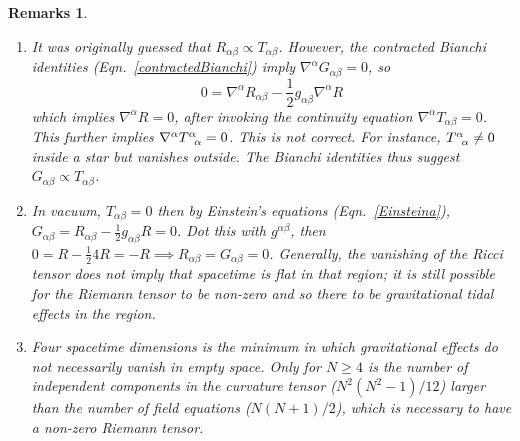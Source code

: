 \documentclass[a4paper]{article}
\newtheorem{remarks}{Remarks}[section]
\theoremstyle{new}
\begin{document}
\begin{remarks}\leavevmode
\begin{enumerate}
    \item It was originally guessed that $R_{\alpha\beta}\propto T_{\alpha\beta}$. However, the contracted Bianchi identities (Eqn.~\ref{contractedBianchi}) imply $\nabla^\alpha G_{\alpha\beta}=0$, so
    $$0=\nabla^\alpha R_{\alpha\beta}-\frac{1}{2}g_{\alpha\beta}\nabla^\alpha R$$
    which implies $\nabla^\alpha R=0$, after invoking the continuity equation $\nabla^\alpha T_{\alpha\beta}=0$. This further implies $\nabla^\alpha \tensor*{T}{*_{}^{\alpha}_{\alpha}}=0$. This is not correct. For instance, $\tensor*{T}{*_{}^{\alpha}_{\alpha}}\neq0$ inside a star but vanishes outside. The Bianchi identities thus suggest $G_{\alpha\beta}\propto T_{\alpha\beta}$.
    \item In vacuum, $T_{\alpha\beta}=0$ then by Einstein's equations (Eqn.~\ref{Einsteina}),  $G_{\alpha\beta}=R_{\alpha\beta}-\frac{1}{2}g_{\alpha\beta}R=0$. Dot this with $g^{\alpha\beta}$, then $0=R-\frac{1}{2}4R=-R\implies R_{\alpha\beta}=G_{\alpha\beta}=0$. Generally, the vanishing of the Ricci tensor does not imply that spacetime is flat in that region; it is still possible for the Riemann tensor to be non-zero and so there to be gravitational tidal effects in the region.
    \item Four spacetime dimensions is the minimum in which gravitational effects do not necessarily vanish in empty space. Only for $N\geq4$ is the number of independent components in the curvature tensor ($N^2(N^2-1)/12$) larger than the number of field equations ($N(N+1)/2$), which is necessary to have a non-zero Riemann tensor.
\end{enumerate}
\end{remarks}
\end{document}
